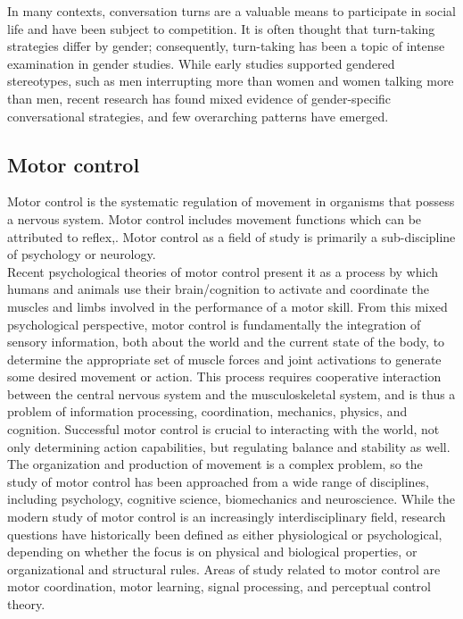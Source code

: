 In many contexts, conversation turns are a valuable means to participate in social life 
and have been subject to competition.\cite{DOMER2011} It is often thought that turn-taking strategies 
differ by gender; consequently, turn-taking has been a topic of intense examination in 
gender studies. While early studies supported gendered stereotypes, such as men interrupting
more than women and women talking more than men,\cite{DefineSocial2005} recent research has found mixed evidence 
of gender-specific conversational strategies, and few overarching patterns have emerged.\cite{SocialInteract2003}\\



\subsection{Motor control}
Motor control is the systematic regulation of movement in organisms that possess 
a nervous system. Motor control includes movement functions which can be attributed 
to reflex,\cite{BehaviorlaStudy1964}. Motor control as a field of study is primarily a sub-discipline of 
psychology or neurology.\\


Recent psychological theories of motor control present it as a process by which 
humans and animals use their brain/cognition to activate and coordinate the muscles 
and limbs involved in the performance of a motor skill. From this mixed psychological 
perspective, motor control is fundamentally the integration of sensory information, 
both about the world and the current state of the body, to determine the appropriate 
set of muscle forces and joint activations to generate some desired movement or action. 
This process requires cooperative interaction between the central nervous system and 
the musculoskeletal system, and is thus a problem of information processing, 
coordination, mechanics, physics, and cognition.\cite{RoboticMovement, EnhanceEmpiri2011} Successful motor control 
is crucial to interacting with the world, not only determining action capabilities, 
but regulating balance and stability as well.\\


The organization and production of movement is a complex problem, so the study of 
motor control has been approached from a wide range of disciplines, including 
psychology, cognitive science, biomechanics and neuroscience. While the modern 
study of motor control is an increasingly interdisciplinary field, research 
questions have historically been defined as either physiological or psychological, 
depending on whether the focus is on physical and biological properties, or 
organizational and structural rules.\cite{DOMER2011} Areas of study related to motor control 
are motor coordination, motor learning, signal processing, and perceptual control 
theory.\\

